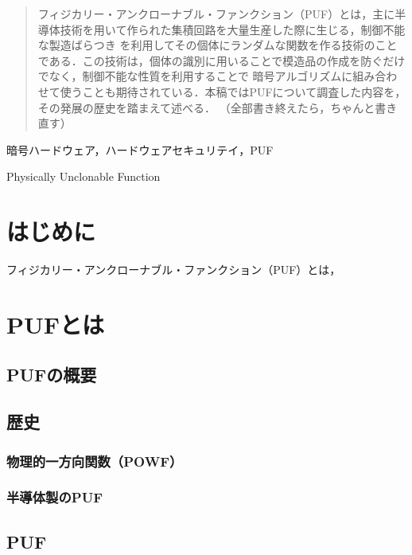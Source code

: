 \documentclass[survey]{ieicej}%
\begin{document}
\begin{abstract}
  フィジカリー・アンクローナブル・ファンクション（PUF）とは，主に半導体技術を用いて作られた集積回路を大量生産した際に生じる，制御不能な製造ばらつき
  を利用してその個体にランダムな関数を作る技術のことである．この技術は，個体の識別に用いることで模造品の作成を防ぐだけでなく，制御不能な性質を利用することで
  暗号アルゴリズムに組み合わせて使うことも期待されている．本稿ではPUFについて調査した内容を，その発展の歴史を踏まえて述べる．
  （全部書き終えたら，ちゃんと書き直す）
\end{abstract}
\begin{keyword}
  暗号ハードウェア，ハードウェアセキュリテイ，PUF
\end{keyword}
\begin{eabstract}
\end{eabstract}
\begin{ekeyword}
  Physically Unclonable Function
\end{ekeyword}
\maketitle

\section{はじめに}
フィジカリー・アンクローナブル・ファンクション（PUF）とは，

\section{PUFとは}
\subsection{PUFの概要}
\subsection{歴史}
\subsubsection{物理的一方向関数（POWF）}
\subsubsection{半導体製のPUF}
\subsection{PUF}
\end{document}

